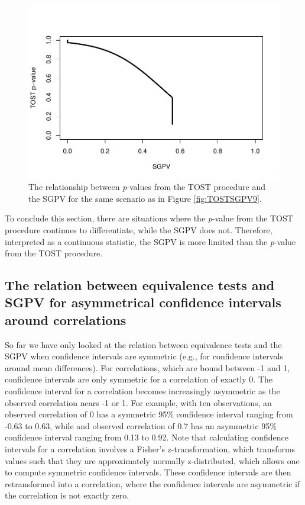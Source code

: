 \documentclass[,man,floatsintext]{apa6}
\begin{document}
\begin{figure}
\centering
\includegraphics{manuscript.R2_files/figure-latex/TOSTSGPV10-1.pdf}
\caption{\label{fig:TOSTSGPV10}The relationship between \emph{p}-values from the TOST procedure and the SGPV for the same scenario as in Figure \ref{fig:TOSTSGPV9}.}
\end{figure}

To conclude this section, there are situations where the \emph{p}-value from the TOST procedure continues to differentiate, while the SGPV does not. Therefore, interpreted as a continuous statistic, the SGPV is more limited than the \emph{p}-value from the TOST procedure.

\hypertarget{the-relation-between-equivalence-tests-and-sgpv-for-asymmetrical-confidence-intervals-around-correlations}{%
\subsection{The relation between equivalence tests and SGPV for asymmetrical confidence intervals around correlations}\label{the-relation-between-equivalence-tests-and-sgpv-for-asymmetrical-confidence-intervals-around-correlations}}

So far we have only looked at the relation between equivalence tests and the SGPV when confidence intervals are symmetric (e.g., for confidence intervals around mean differences). For correlations, which are bound between -1 and 1, confidence intervals are only symmetric for a correlation of exactly 0. The confidence interval for a correlation becomes increasingly asymmetric as the observed correlation nears -1 or 1. For example, with ten observations, an observed correlation of 0 has a symmetric 95\% confidence interval ranging from -0.63 to 0.63, while and observed correlation of 0.7 has an asymmetric 95\% confidence interval ranging from 0.13 to 0.92. Note that calculating confidence intervals for a correlation involves a Fisher's z-transformation, which transforms values such that they are approximately normally z-distributed, which allows one to compute symmetric confidence intervals. These confidence intervals are then retransformed into a correlation, where the confidence intervals are asymmetric if the correlation is not exactly zero.
\end{document}
